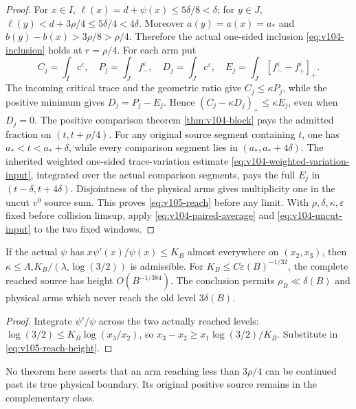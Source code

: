 \begin{proof}
For $x\in I$, $\ell(x)=d+\psi(x)\le5\delta/8<\delta$;
for $y\in J$, $\ell(y)<d+3\rho/4\le5\delta/4<4\delta$.
Moreover $a(y)=a(x)=a_*$ and
$b(y)-b(x)>3\rho/8>\rho/4$. Therefore the actual one-sided
inclusion \eqref{eq:v104-inclusion} holds at $r=\rho/4$.
For each arm put
\[
C_j=\int_Ic^\varepsilon,\quad P_j=\int_Jf_-^\varepsilon,\quad
D_j=\int_Jc^\varepsilon,\quad
E_j=\int_J[f_-^\varepsilon-f_+^\varepsilon]_+.
\]
The incoming critical trace and the geometric ratio give
$C_j\le\kappa P_j$, while the positive minimum gives
$D_j=P_j-E_j$. Hence
$(C_j-\kappa D_j)_+\le\kappa E_j$, even when $D_j=0$.
The positive comparison theorem \ref{thm:v104-block} pays the
admitted fraction on $(t,t+\rho/4)$. For any original source
segment containing $t$, one has $a_*<t<a_*+\delta$, while
every comparison segment lies in $(a_*,a_*+4\delta)$.
The inherited weighted one-sided trace-variation estimate
\eqref{eq:v104-weighted-variation-input}, integrated over the
actual comparison segments, pays the full $E_j$ in
$(t-\delta,t+4\delta)$. Disjointness of the physical arms gives
multiplicity one in the uncut $v^0$ source sum.
This proves \eqref{eq:v105-reach} before any limit.
With $\rho,\delta,\kappa,\varepsilon$ fixed before collision
limsup, apply \eqref{eq:v104-paired-average} and
\eqref{eq:v104-uncut-input} to the two fixed windows.
\end{proof}
\begin{corollary}\label{cor:v105-elastic}
If the actual $\psi$ has
$x\psi'(x)/\psi(x)\le K_B$ almost everywhere on $(x_2,x_3)$,
then $\kappa\le\Lambda_\circ K_B/
(\lambda_\circ\log(3/2))$ is admissible.
For $K_B\le C\varepsilon(B)^{-1/32}$,
the complete reached source has height $O(B^{-1/384})$.
The conclusion permits $\rho_B\ll\delta(B)$ and physical arms
which never reach the old level $3\delta(B)$.
\end{corollary}
\begin{proof}
Integrate $\psi'/\psi$ across the two actually reached levels:
$\log(3/2)\le K_B\log(x_3/x_2)$, so
$x_3-x_2\ge x_1\log(3/2)/K_B$.
Substitute in \eqref{eq:v105-reach-height}.
\end{proof}
No theorem here asserts that an arm reaching less than
$3\rho/4$ can be continued past its true physical boundary.
Its original positive source remains in the complementary class.
